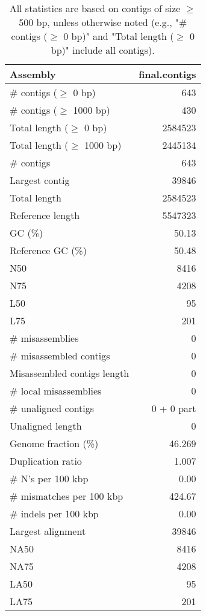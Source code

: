 \documentclass[12pt,a4paper]{article}
\begin{document}
\begin{table}[ht]
\begin{center}
\caption{All statistics are based on contigs of size $\geq$ 500 bp, unless otherwise noted (e.g., "\# contigs ($\geq$ 0 bp)" and "Total length ($\geq$ 0 bp)" include all contigs).}
\begin{tabular}{|l*{1}{|r}|}
\hline
Assembly & final.contigs \\ \hline
\# contigs ($\geq$ 0 bp) & 643 \\ \hline
\# contigs ($\geq$ 1000 bp) & 430 \\ \hline
Total length ($\geq$ 0 bp) & 2584523 \\ \hline
Total length ($\geq$ 1000 bp) & 2445134 \\ \hline
\# contigs & 643 \\ \hline
Largest contig & 39846 \\ \hline
Total length & 2584523 \\ \hline
Reference length & 5547323 \\ \hline
GC (\%) & 50.13 \\ \hline
Reference GC (\%) & 50.48 \\ \hline
N50 & 8416 \\ \hline
N75 & 4208 \\ \hline
L50 & 95 \\ \hline
L75 & 201 \\ \hline
\# misassemblies & 0 \\ \hline
\# misassembled contigs & 0 \\ \hline
Misassembled contigs length & 0 \\ \hline
\# local misassemblies & 0 \\ \hline
\# unaligned contigs & 0 + 0 part \\ \hline
Unaligned length & 0 \\ \hline
Genome fraction (\%) & 46.269 \\ \hline
Duplication ratio & 1.007 \\ \hline
\# N's per 100 kbp & 0.00 \\ \hline
\# mismatches per 100 kbp & 424.67 \\ \hline
\# indels per 100 kbp & 0.00 \\ \hline
Largest alignment & 39846 \\ \hline
NA50 & 8416 \\ \hline
NA75 & 4208 \\ \hline
LA50 & 95 \\ \hline
LA75 & 201 \\ \hline
\end{tabular}
\end{center}
\end{table}
\end{document}
